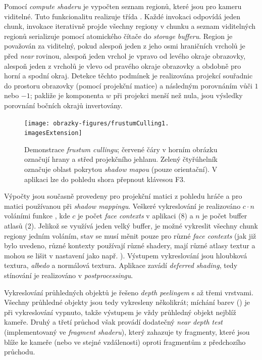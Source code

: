 Pomocí \textit{compute shaderu} je vypočten seznam regionů, které jsou pro kameru viditelné. Tuto funkcionalitu realizuje třída . Každé invokaci odpovídá jeden chunk, invokace iterativně projde všechny regiony v chunku a seznam viditelných regionů serializuje pomocí atomického čítače do \textit{storage bufferu}. Region je považován za viditelný, pokud alespoň jeden z jeho osmi hraničních vrcholů je před \textit{near} rovinou, alespoň jeden vrchol je vpravo od levého okraje obrazovky, alespoň jeden z vrcholů je vlevo od pravého okraje obrazovky a obdobně pro horní a spodní okraj. Detekce těchto podmínek je realizována projekcí souřadnic do prostoru obrazovky (pomocí projekční matice) a následným porovnáním vůči $1$ nebo $-1$; pakliže je komponenta $w$ při projekci menší než nula, jsou výsledky porovnání bočních okrajů invertovány.

\begin{figure}[H]
	\centering
	\begin{minipage}{\textwidth}
		\centering
		\texttt{[image: obrazky-figures/frustumCulling1.\\imagesExtension]}
	\end{minipage}
	\vspace{2mm}
	
	\caption{Demonstrace \textit{frustum cullingu}; červené čáry v horním obrázku označují hrany a střed projekčního jehlanu. Zelený čtyřúhelník označuje oblast pokrytou \textit{shadow mapou} (pouze orientační). V aplikaci lze do pohledu shora přepnout klávesou F3.}
\end{figure}

Výpočty jsou současně provedeny pro projekční matici z pohledu hráče a pro matici používanou při \textit{shadow mappingu}. Veškeré vykreslování je realizováno $c \cdot n$ voláními funkce , kde $c$ je počet \textit{face contexts} v aplikaci (8) a $n$ je počet buffer atlasů (2). Jelikož se využívá jeden velký buffer, je možné vykreslit všechny chunk regiony jedním voláním, stav se musí měnit pouze pro různé \textit{face contexts} (jak již bylo uvedeno, různé kontexty používají různé shadery, mají různé atlasy textur a mohou se lišit v nastavení jako např. ). Výstupem vykreslování jsou hloubková textura, \textit{albedo} a normálová textura. Aplikace zavádí \textit{deferred shading}, tedy stínování je realizováno v \textit{postprocessingu}.

Vykreslování průhledných objektů je řešeno \textit{depth peelingem} s až třemi vrstvami. Všechny průhledné objekty jsou tedy vykresleny několikrát; míchání barev () je při vykreslování vypnuto, takže výstupem je vždy průhledný objekt nejblíž kameře. Druhý a třetí průchod však provádí dodatečný \textit{near depth test} (implementovaný ve \textit{fragment shaderu}), který zahazuje ty fragmenty, které jsou blíže ke kameře (nebo ve stejné vzdálenosti) oproti fragmentům z předchozího průchodu.

